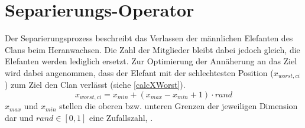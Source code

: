 \section{Separierungs-Operator} \label{eho_separate}
Der Separierungsprozess beschreibt das Verlassen der männlichen Elefanten des Clans beim Heranwachsen. Die Zahl der Mitglieder bleibt dabei jedoch gleich, die Elefanten werden lediglich ersetzt. Zur Optimierung der Annäherung an das Ziel wird dabei angenommen, dass der Elefant mit der schlechtesten Position ($x_{worst, ci}$) zum Ziel den Clan verlässt (siehe \autoref{calcXWorst}).
\begin{equation}
    x_{worst, ci} = x_{min} + (x_{max} - x_{min} + 1) \cdot rand
    \label{calcXWorst}
\end{equation}
$x_{max}$ und $x_{min}$ stellen die oberen bzw. unteren Grenzen der jeweiligen Dimension dar und $rand \in [0,1]$ eine Zufallszahl, \cite[vgl. Wang et al, S.2]{wang_deb_coelho_2015}.


